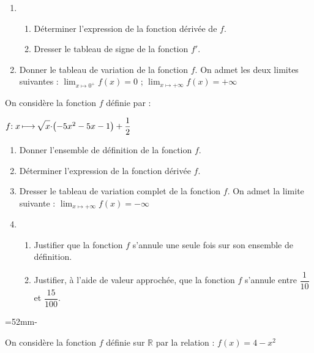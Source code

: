 \documentclass{book}
\begin{document}
\begin{multicols*}{2}
\begin{enumerate}
\item \begin{enumerate}
\item D\'eterminer l'expression de la fonction d\'eriv\'ee de $f$.

\item Dresser le tableau de signe de la fonction $f'$.
\end{enumerate}

\item Donner le tableau de variation de la fonction $f$.\newline
On admet les deux limites suivantes :\newline
\hglue\leftmarginii$\lim_{x\mapsto0^+} f(x)=0$%
\quad\string;\quad%
$\lim_{x\mapsto+\infty} f(x)=+\infty$
\end{enumerate}

\leavevmode\exercice


On consid\`ere la fonction $f$ d\'efinie par :

\hglue\leftmargini$f{:x}\longmapsto \sqrt{x\mathstrut}{\cdot}\big({-}5x^2-5x-1\big)+\dfrac12$

\begin{enumerate}
\item Donner l'ensemble de d\'efinition de la fonction $f$.

\item D\'eterminer l'expression de la fonction d\'eriv\'ee $f$.

\item Dresser le tableau de variation complet de la fonction $f$.\newline
On admet la limite suivante :%
\quad$\lim_{x\mapsto+\infty} f(x)=-\infty$

\item \begin{enumerate}
\item Justifier que la fonction $f$ s'annule une seule fois sur son ensemble de d\'efinition.

\item Justifier, \`a l'aide de valeur approch\'ee,  que la fonction $f$ s'annule entre $\dfrac{1}{10}$ et $\dfrac{15}{100}$.
\end{enumerate}
\end{enumerate}


\leavevmode\exercice[*]


=52mm\hsize\advance{}-
\begin{minipage}[t]{\dimen1}
On consid\`ere la fonction $f$ d\'efinie sur $\mathbb{R}$ par la relation :\newline
\hglue\leftmargini$f(x)=4-x^2$


\end{minipage}
\end{multicols*}
\end{document}
